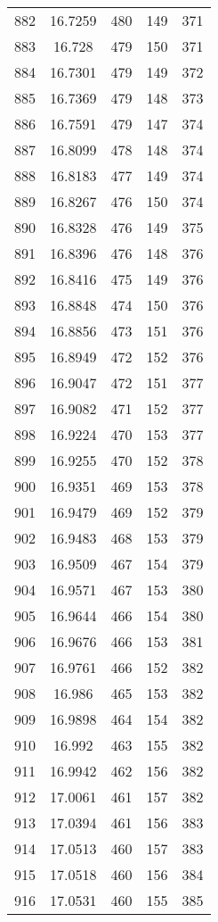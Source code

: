 \documentclass[12pt,a4paper]{article}
\begin{document}
\begin{tabular}{r|cccc}
	882 & 16.7259 & 480 & 149 & 371 \\
	883 & 16.728 & 479 & 150 & 371 \\
	884 & 16.7301 & 479 & 149 & 372 \\
	885 & 16.7369 & 479 & 148 & 373 \\
	886 & 16.7591 & 479 & 147 & 374 \\
	887 & 16.8099 & 478 & 148 & 374 \\
	888 & 16.8183 & 477 & 149 & 374 \\
	889 & 16.8267 & 476 & 150 & 374 \\
	890 & 16.8328 & 476 & 149 & 375 \\
	891 & 16.8396 & 476 & 148 & 376 \\
	892 & 16.8416 & 475 & 149 & 376 \\
	893 & 16.8848 & 474 & 150 & 376 \\
	894 & 16.8856 & 473 & 151 & 376 \\
	895 & 16.8949 & 472 & 152 & 376 \\
	896 & 16.9047 & 472 & 151 & 377 \\
	897 & 16.9082 & 471 & 152 & 377 \\
	898 & 16.9224 & 470 & 153 & 377 \\
	899 & 16.9255 & 470 & 152 & 378 \\
	900 & 16.9351 & 469 & 153 & 378 \\
	901 & 16.9479 & 469 & 152 & 379 \\
	902 & 16.9483 & 468 & 153 & 379 \\
	903 & 16.9509 & 467 & 154 & 379 \\
	904 & 16.9571 & 467 & 153 & 380 \\
	905 & 16.9644 & 466 & 154 & 380 \\
	906 & 16.9676 & 466 & 153 & 381 \\
	907 & 16.9761 & 466 & 152 & 382 \\
	908 & 16.986 & 465 & 153 & 382 \\
	909 & 16.9898 & 464 & 154 & 382 \\
	910 & 16.992 & 463 & 155 & 382 \\
	911 & 16.9942 & 462 & 156 & 382 \\
	912 & 17.0061 & 461 & 157 & 382 \\
	913 & 17.0394 & 461 & 156 & 383 \\
	914 & 17.0513 & 460 & 157 & 383 \\
	915 & 17.0518 & 460 & 156 & 384 \\
	916 & 17.0531 & 460 & 155 & 385 \\

\end{tabular}
\end{document}
